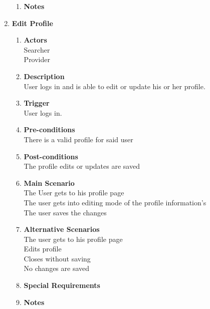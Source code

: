 \documentclass{scrreprt}
\begin{document}
\begin{enumerate}
\begin{enumerate}
		\item \textbf{Notes} \\
	\end{enumerate}


	\item \textbf{Edit Profile}
	\begin{enumerate}
		\item \textbf{Actors}  \\
			Searcher\\
			Provider\\

		\item \textbf{Description} \\
			User logs in and is able to edit or update his or her profile.\\
			
		\item \textbf{Trigger} \\
			User logs in.\\

		\item \textbf{Pre-conditions} \\
			There is a valid profile for said user\\

		\item \textbf{Post-conditions} \\
			The profile edits or updates are saved\\

		\item \textbf{Main Scenario} \\
			The User gets to his profile page\\
			The user gets into editing mode of the profile information’s\\
			The user saves the changes\\

		\item \textbf{Alternative Scenarios} \\
			The user gets to his profile page\\
			Edits profile\\
			Closes without saving\\
			No changes are saved\\
		\item \textbf{Special Requirements} \\

		\item \textbf{Notes} \\
	\end{enumerate}


\end{enumerate}
\end{document}
